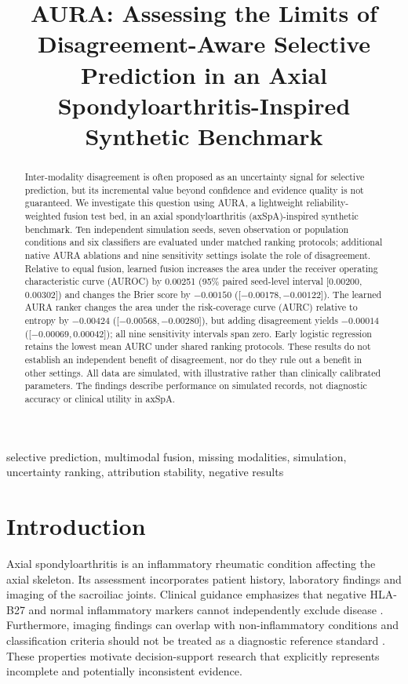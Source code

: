 \documentclass[conference]{IEEEtran}
\title{AURA: Assessing the Limits of Disagreement-Aware Selective Prediction in an Axial Spondyloarthritis-Inspired Synthetic Benchmark}
\author{\IEEEauthorblockN{Susmit Naskar}\IEEEauthorblockA{Department of Computer Science and Engineering\\Institute of Engineering and Management, Kolkata, India}}
\begin{document}
\maketitle
\begin{abstract}
Inter-modality disagreement is often proposed as an uncertainty signal for selective prediction, but its incremental value beyond confidence and evidence quality is not guaranteed. We investigate this question using AURA, a lightweight reliability-weighted fusion test bed, in an axial spondyloarthritis (axSpA)-inspired synthetic benchmark. Ten independent simulation seeds, seven observation or population conditions and six classifiers are evaluated under matched ranking protocols; additional native AURA ablations and nine sensitivity settings isolate the role of disagreement. Relative to equal fusion, learned fusion increases the area under the receiver operating characteristic curve (AUROC) by 0.00251 (95\% paired seed-level interval [0.00200, 0.00302]) and changes the Brier score by $-0.00150$ ([$-0.00178,-0.00122$]). The learned AURA ranker changes the area under the risk-coverage curve (AURC) relative to entropy by $-0.00424$ ([$-0.00568,-0.00280$]), but adding disagreement yields $-0.00014$ ([$-0.00069,0.00042$]); all nine sensitivity intervals span zero. Early logistic regression retains the lowest mean AURC under shared ranking protocols. These results do not establish an independent benefit of disagreement, nor do they rule out a benefit in other settings. All data are simulated, with illustrative rather than clinically calibrated parameters. The findings describe performance on simulated records, not diagnostic accuracy or clinical utility in axSpA.
\end{abstract}
\begin{IEEEkeywords}
selective prediction, multimodal fusion, missing modalities, simulation, uncertainty ranking, attribution stability, negative results
\end{IEEEkeywords}
\section{Introduction}
Axial spondyloarthritis is an inflammatory rheumatic condition affecting the axial skeleton. Its assessment incorporates patient history, laboratory findings and imaging of the sacroiliac joints. Clinical guidance emphasizes that negative HLA-B27 and normal inflammatory markers cannot independently exclude disease \cite{nice}. Furthermore, imaging findings can overlap with non-inflammatory conditions and classification criteria should not be treated as a diagnostic reference standard \cite{mri,asas}. These properties motivate decision-support research that explicitly represents incomplete and potentially inconsistent evidence.
\end{document}
